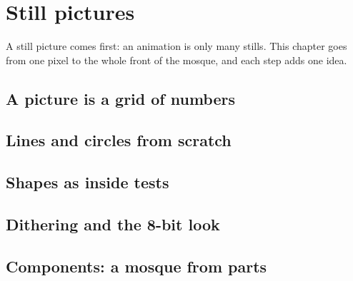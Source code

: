 \chapter{Still pictures}\label{ch:stills}

A still picture comes first: an animation is only many stills. This chapter goes from one pixel to the whole front of the mosque, and each step adds one idea.

\section{A picture is a grid of numbers}

\section{Lines and circles from scratch}

\section{Shapes as inside tests}

\section{Dithering and the 8-bit look}

\section{Components: a mosque from parts}

